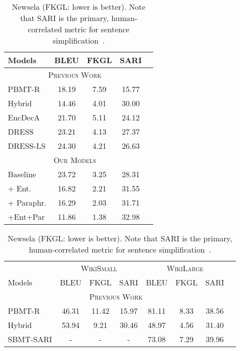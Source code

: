 \documentclass[11pt]{article}
\begin{document}
 
\begin{table}[t]
\begin{minipage}[t]{.365\linewidth}
\begin{center}
\begin{small}
\begin{tabular}{|l|c|c|c|c|}
\hline
Models & BLEU & FKGL & SARI\\
\hline
\multicolumn{4}{|c|}{\textsc{Previous Work}}\\
\hline
PBMT-R & 18.19 & 7.59 & 15.77 \\
Hybrid & 14.46 & 4.01 & 30.00 \\
EncDecA & 21.70 & 5.11 & 24.12 \\
DRESS & 23.21 & 4.13 & 27.37 \\
DRESS-LS & 24.30 & 4.21 & 26.63 \\
\hline
\multicolumn{4}{|c|}{\textsc{Our Models}}\\
\hline
Baseline  & 23.72 & 3.25 & 28.31 \\
 + Ent. & 16.82 & 2.21 & 31.55 \\
 + Paraphr. & 16.29 & 2.03 & 31.71 \\
+Ent+Par & 11.86 & 1.38 & 32.98 \\
\hline
\end{tabular}
\end{small}
\end{center}
\vspace{-10pt}
\caption{Newsela (FKGL: lower is better). Note that SARI is the primary, human-correlated metric for sentence simplification~\cite{Xu2016OptimizingSM}.}
\vspace{-5pt}
\label{table:newsela_results}
\end{minipage}
\hfill
\begin{minipage}[t]{.595\linewidth}
\begin{center}
\begin{small}
\begin{tabular}{|l|c|c|c|c|c|c|c|}
\hline
& \multicolumn{3}{c|}{\textsc{WikiSmall}} & \multicolumn{3}{c|}{\textsc{WikiLarge}}\\
Models & BLEU & FKGL & SARI &  BLEU & FKGL & SARI\\
\hline
\multicolumn{7}{|c|}{\textsc{Previous Work}}\\
\hline
PBMT-R  & 46.31 & 11.42 & 15.97 & 81.11 & 8.33 & 38.56 \\
Hybrid  & 53.94 & 9.21 & 30.46 & 48.97 & 4.56 & 31.40 \\
SBMT-SARI  & - & - & -  & 73.08 & 7.29 & 39.96\\

\end{tabular}
\end{small}
\end{center}
\end{minipage}
\end{table}
\end{document}

